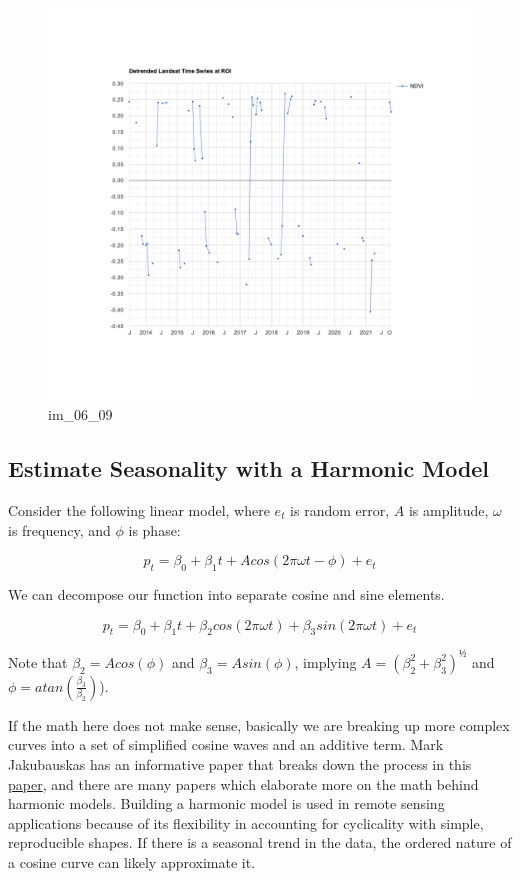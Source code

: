 \documentclass[
]{article}
\begin{document}
\begin{figure}
\centering
\includegraphics{./im/im_06_04.png}
\caption{im\_06\_09}
\end{figure}

\hypertarget{estimate-seasonality-with-a-harmonic-model}{%
\subsection{Estimate Seasonality with a Harmonic Model}\label{estimate-seasonality-with-a-harmonic-model}}

Consider the following linear model, where \(e_t\) is random error, \(A\) is amplitude, \(\omega\) is frequency, and \(\phi\) is phase:

\[
p_t = \beta_0 + \beta_1t + Acos(2\pi\omega t - \phi) + e_t
\]

We can decompose our function into separate cosine and sine elements.

\[
p_t = \beta_0 + \beta_1t + \beta_2cos(2\pi\omega t) + \beta_3sin(2\pi\omega t) + e_t
\]

Note that \(\beta_2 = Acos(\phi)\) and \(\beta_3 = Asin(\phi)\), implying \(A = (\beta_2^2 + \beta_3^2)^½\) and \(\phi = atan(\frac{\beta_3}{\beta_2})\)).

If the math here does not make sense, basically we are breaking up more complex curves into a set of simplified cosine waves and an additive term. Mark Jakubauskas has an informative paper that breaks down the process in this \href{https://www.isprs.org/proceedings/xxxiii/congress/part4/384_xxxiii-part4.pdf}{paper}, and there are many papers which elaborate more on the math behind harmonic models. Building a harmonic model is used in remote sensing applications because of its flexibility in accounting for cyclicality with simple, reproducible shapes. If there is a seasonal trend in the data, the ordered nature of a cosine curve can likely approximate it.
\end{document}
